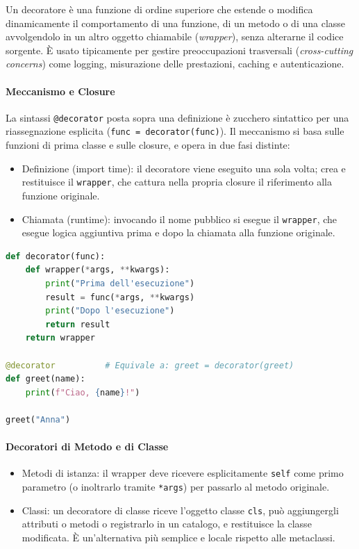\documentclass[12pt]{extarticle}
\begin{document}
Un decoratore è una funzione di ordine superiore che estende o modifica dinamicamente il comportamento di una funzione, di un metodo o di una classe avvolgendolo in un altro oggetto chiamabile (\emph{wrapper}), senza alterarne il codice sorgente. È usato tipicamente per gestire preoccupazioni trasversali (\emph{cross-cutting concerns}) come logging, misurazione delle prestazioni, caching e autenticazione.

\paragraph{Meccanismo e Closure}
La sintassi \texttt{@decorator} posta sopra una definizione è zucchero sintattico per una riassegnazione esplicita (\texttt{func = decorator(func)}). Il meccanismo si basa sulle funzioni di prima classe e sulle closure, e opera in due fasi distinte:
\begin{itemize}
\item Definizione (import time): il decoratore viene eseguito una sola volta; crea e restituisce il \texttt{wrapper}, che cattura nella propria closure il riferimento alla funzione originale.
\item Chiamata (runtime): invocando il nome pubblico si esegue il \texttt{wrapper}, che esegue logica aggiuntiva prima e dopo la chiamata alla funzione originale.
\end{itemize}

\begin{lstlisting}[language=Python]
def decorator(func):
    def wrapper(*args, **kwargs):
        print("Prima dell'esecuzione")
        result = func(*args, **kwargs)
        print("Dopo l'esecuzione")
        return result
    return wrapper

@decorator          # Equivale a: greet = decorator(greet)
def greet(name):
    print(f"Ciao, {name}!")

greet("Anna")
\end{lstlisting}

\paragraph{Decoratori di Metodo e di Classe}
\begin{itemize}
\item Metodi di istanza: il wrapper deve ricevere esplicitamente \texttt{self} come primo parametro (o inoltrarlo tramite \texttt{*args}) per passarlo al metodo originale.
\item Classi: un decoratore di classe riceve l'oggetto classe \texttt{cls}, può aggiungergli attributi o metodi o registrarlo in un catalogo, e restituisce la classe modificata. È un'alternativa più semplice e locale rispetto alle metaclassi.
\end{itemize}
\end{document}
